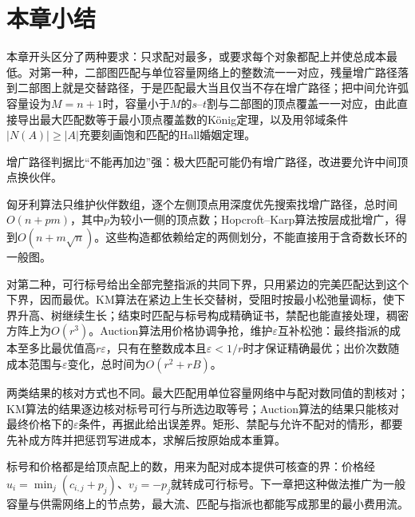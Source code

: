 \FloatBarrier
\section{本章小结}
\label{sec:matching-assignment-summary}

本章开头区分了两种要求：只求配对最多，或要求每个对象都配上并使总成本最低。对第一种，二部图匹配与单位容量网络上的整数流一一对应，残量增广路径落到二部图上就是交替路径，于是匹配最大当且仅当不存在增广路径；把中间允许弧容量设为$M=n+1$时，容量小于$M$的$s$--$t$割与二部图的顶点覆盖一一对应，由此直接导出最大匹配数等于最小顶点覆盖数的König定理，以及用邻域条件$|N(A)|\geq|A|$充要刻画饱和匹配的Hall婚姻定理。

增广路径判据比“不能再加边”强：极大匹配可能仍有增广路径，改进要允许中间顶点换伙伴。

匈牙利算法只维护伙伴数组，逐个左侧顶点用深度优先搜索找增广路径，总时间$O(n+pm)$，其中$p$为较小一侧的顶点数；Hopcroft--Karp算法按层成批增广，得到$O(n+m\sqrt n)$。这些构造都依赖给定的两侧划分，不能直接用于含奇数长环的一般图。

对第二种，可行标号给出全部完整指派的共同下界，只用紧边的完美匹配达到这个下界，因而最优。KM算法在紧边上生长交替树，受阻时按最小松弛量调标，使下界升高、树继续生长；结束时匹配与标号构成精确证书，禁配也能直接处理，稠密方阵上为$O(r^3)$。Auction算法用价格协调争抢，维护$\varepsilon$互补松弛：最终指派的成本至多比最优值高$r\varepsilon$，只有在整数成本且$\varepsilon<1/r$时才保证精确最优；出价次数随成本范围与$\varepsilon$变化，总时间为$O(r^2+rB)$。

两类结果的核对方式也不同。最大匹配用单位容量网络中与配对数同值的割核对；KM算法的结果逐边核对标号可行与所选边取等号；Auction算法的结果只能核对最终价格下的$\varepsilon$条件，再据此给出误差界。矩形、禁配与允许不配对的情形，都要先补成方阵并把惩罚写进成本，求解后按原始成本重算。

标号和价格都是给顶点配上的数，用来为配对成本提供可核查的界：价格经$u_i=\min_j(c_{i,j}+p_j)$、$v_j=-p_j$就转成可行标号。下一章把这种做法推广为一般容量与供需网络上的节点势，最大流、匹配与指派也都能写成那里的最小费用流。
